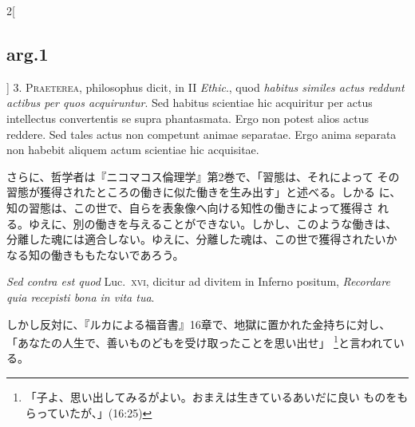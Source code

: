 \documentclass[paper=a4paper,fontsize=10pt,jafontsize=9pt,titlepage]{jlreq}
\begin{document}
\begin{paracol}{2}[\subsection{arg.1}]
3. {\scshape Praeterea}, philosophus dicit, in II {\itshape Ethic}., quod {\itshape
habitus similes actus reddunt actibus per quos acquiruntur}. Sed
habitus scientiae hic acquiritur per actus intellectus convertentis se
supra phantasmata. Ergo non potest alios actus reddere. Sed tales
actus non competunt animae separatae. Ergo anima separata non habebit
aliquem actum scientiae hic acquisitae.

\switchcolumn

さらに、哲学者は『ニコマコス倫理学』第2巻で、「習態は、それによって
その習態が獲得されたところの働きに似た働きを生み出す」と述べる。しかる
に、知の習態は、この世で、自らを表象像へ向ける知性の働きによって獲得さ
れる。ゆえに、別の働きを与えることができない。しかし、このような働きは、
分離した魂には適合しない。ゆえに、分離した魂は、この世で獲得されたいか
なる知の働きももたないであろう。

\switchcolumn*[\subsection{s.c.}]

{\itshape Sed contra est quod} Luc.~{\scshape xvi}, dicitur ad divitem in
Inferno positum, {\itshape Recordare quia recepisti bona in vita tua}.

\switchcolumn

しかし反対に、『ルカによる福音書』16章で、地獄に置かれた金持ちに対し、
「あなたの人生で、善いものどもを受け取ったことを思い出せ」
\footnote{「子よ、思い出してみるがよい。おまえは生きているあいだに良い
ものをもらっていたが、」(16:25)}と言われている。



\end{paracol}
\end{document}
